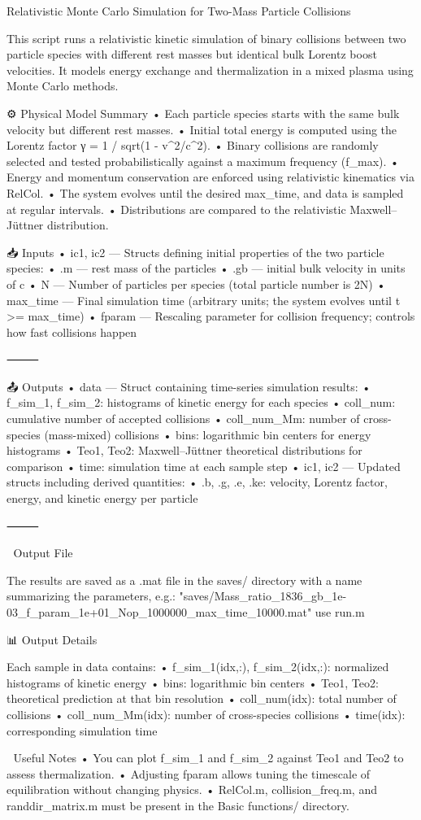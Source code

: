 Relativistic Monte Carlo Simulation for Two-Mass Particle Collisions

This script runs a relativistic kinetic simulation of binary collisions between two particle species with different rest masses but identical bulk Lorentz boost velocities. It models energy exchange and thermalization in a mixed plasma using Monte Carlo methods.

⚙️ Physical Model Summary
	•	Each particle species starts with the same bulk velocity but different rest masses.
	•	Initial total energy is computed using the Lorentz factor γ = 1 / sqrt(1 - v^2/c^2).
	•	Binary collisions are randomly selected and tested probabilistically against a maximum frequency (f_max).
	•	Energy and momentum conservation are enforced using relativistic kinematics via RelCol.
	•	The system evolves until the desired max_time, and data is sampled at regular intervals.
	•	Distributions are compared to the relativistic Maxwell–Jüttner distribution.


📥 Inputs
	•	ic1, ic2 — Structs defining initial properties of the two particle species:
	•	.m  — rest mass of the particles
	•	.gb — initial bulk velocity in units of c
	•	N — Number of particles per species (total particle number is 2N)
	•	max_time — Final simulation time (arbitrary units; the system evolves until t >= max_time)
	•	fparam — Rescaling parameter for collision frequency; controls how fast collisions happen

⸻

📤 Outputs
	•	data — Struct containing time-series simulation results:
	•	f_sim_1, f_sim_2: histograms of kinetic energy for each species
	•	coll_num: cumulative number of accepted collisions
	•	coll_num_Mm: number of cross-species (mass-mixed) collisions
	•	bins: logarithmic bin centers for energy histograms
	•	Teo1, Teo2: Maxwell–Jüttner theoretical distributions for comparison
	•	time: simulation time at each sample step
	•	ic1, ic2 — Updated structs including derived quantities:
	•	.b, .g, .e, .ke: velocity, Lorentz factor, energy, and kinetic energy per particle

⸻




📁 Output File

The results are saved as a .mat file in the saves/ directory with a name summarizing the parameters, e.g.:
 "saves/Mass_ratio_1836_gb_1e-03_f_param_1e+01_Nop_1000000_max_time_10000.mat"
use run.m

📊 Output Details

Each sample in data contains:
	•	f_sim_1(idx,:), f_sim_2(idx,:): normalized histograms of kinetic energy
	•	bins: logarithmic bin centers
	•	Teo1, Teo2: theoretical prediction at that bin resolution
	•	coll_num(idx): total number of collisions
	•	coll_num_Mm(idx): number of cross-species collisions
	•	time(idx): corresponding simulation time

🧠 Useful Notes
	•	You can plot f_sim_1 and f_sim_2 against Teo1 and Teo2 to assess thermalization.
	•	Adjusting fparam allows tuning the timescale of equilibration without changing physics.
	•	RelCol.m, collision_freq.m, and randdir_matrix.m must be present in the Basic functions/ directory.

